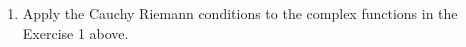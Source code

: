 \documentclass[fleqn]{article}
\begin{document}
\begin{enumerate}
\begin{enumerate}
      \item $F(x,y)=e^y(\cos x+i \sin x)$.

        \textcolor{hwColor}{
          $
            F^'(x,y)=\lim\limits_{\Delta x,\Delta y  \to 0} \left[\dfrac{F(x+\Delta x,y+\Delta y)-F(x,y)}{\Delta x+i \Delta y}\right] \\
            \\
            \\
            ==\lim\limits_{\Delta x,\Delta y  \to 0} \left[     \right]
          $
        }

    \end{enumerate}
    
    \item Apply the Cauchy Riemann conditions to the complex functions in the Exercise 1 above.
    
    
  \end{enumerate}
\end{document}
